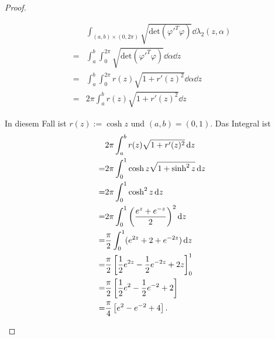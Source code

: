 \begin{proof}
\begin{parts}
	\begin{align*}
		&\int_{(a,b)\times (0,2\pi)}\sqrt{\text{det}(\varphi'^T\varphi)} \dd{\lambda_2(z,\alpha)}\\
		=&\int_a^b\int_0^{2\pi}\sqrt{\text{det}(\varphi'^T\varphi)} \dd{\alpha}\dd{z}\\
		=&\int_a^b\int_0^{2\pi}r(z)\sqrt{1+r'(z)^2}\dd{\alpha}\dd{z}\\
		=&2\pi\int_a^b r(z)\sqrt{1+r'(z)^2} \dd{z}
	\end{align*}
\item In diesem Fall ist $r(z):=\cosh z$ und $(a,b)=(0,1)$. Das Integral ist
	\begin{align*}
		&2\pi\int_a^b r(z)\sqrt{1+r'(z)^2} \dd{z}\\
		=&2\pi\int_0^1 \cosh z\sqrt{1+\sinh^2 z} \dd{z}\\
		=&2\pi\int_0^1 \cosh^2 z\dd{z}\\ 
		=&2\pi\int_0^1 \left( \frac{e^z+e^{-z}}{2} \right)^2 \dd{z}\\
		=&\frac{\pi}{2}\int_0^1 (e^{2z}+2+e^{-2z})\dd{z}\\
		=&\frac{\pi}{2}\left[ \frac{1}{2}e^{2z}-\frac{1}{2}e^{-2z}+2z \right]_0^1\\
		=&\frac{\pi}{2}\left[ \frac{1}{2}e^2-\frac{1}{2}e^{-2}+2 \right] \\
		=&\frac{\pi}{4}\left[ e^2-e^{-2}+4 \right].\qedhere 
	\end{align*}
	\end{parts}
\end{proof}
